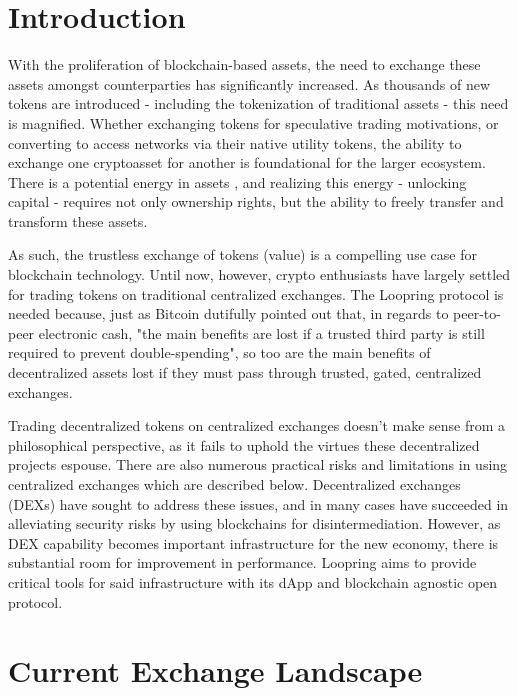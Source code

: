 \documentclass[UTF8,nofonts]{article}
\begin{document}
\begin{multicols}{2}
\section{Introduction\label{sec:introduction}}

With the proliferation of blockchain-based assets, the need to exchange these assets amongst counterparties has significantly increased. As thousands of new tokens are introduced - including the tokenization of traditional assets - this need is magnified. Whether exchanging tokens for speculative trading motivations, or converting to access networks via their native utility tokens, the ability to exchange one cryptoasset for another is foundational for the larger ecosystem. There is a potential energy in assets \cite{desotocapital}, and realizing this energy - unlocking capital - requires not only ownership rights, but the ability to freely transfer and transform these assets.
 
As such, the trustless exchange of tokens (value) is a compelling use case for blockchain technology. Until now, however, crypto enthusiasts have largely settled for trading tokens on traditional centralized exchanges. The Loopring protocol is needed because, just as Bitcoin \cite{nakamoto2008bitcoin} dutifully pointed out that, in regards to peer-to-peer electronic cash, "the main benefits are lost if a trusted third party is still required to prevent double-spending", so too are the main benefits of decentralized assets lost if they must pass through trusted, gated, centralized exchanges.

Trading decentralized tokens on centralized exchanges doesn't make sense from a philosophical perspective, as it fails to uphold the virtues these decentralized projects espouse. There are also numerous practical risks and limitations in using centralized exchanges which are described below. Decentralized exchanges (DEXs) \cite{schuh2015bitshares} \cite{bancor} \cite{kyber} \cite{warren20170x} have sought to address these issues, and in many cases have succeeded in alleviating security risks by using blockchains for disintermediation. However, as DEX capability becomes important infrastructure for the new economy, there is substantial room for improvement in performance. Loopring aims to provide critical tools for said infrastructure with its dApp and blockchain agnostic open protocol. 

\section{Current Exchange Landscape\label{sec:current_exchange_landscape}}


\end{multicols}
\end{document}
